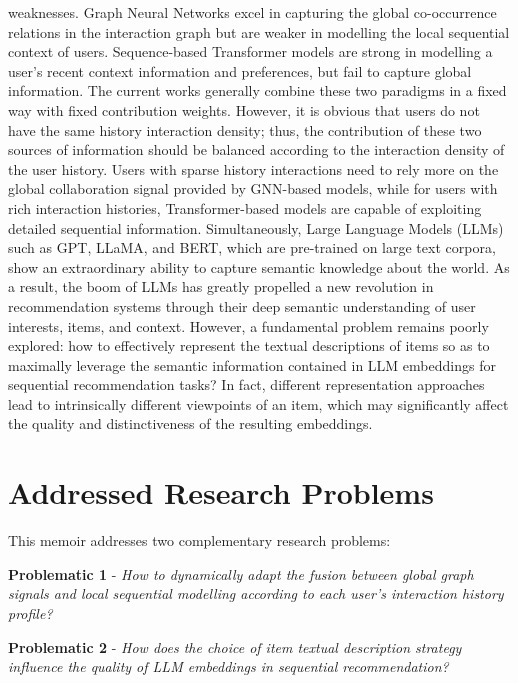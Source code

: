 \documentclass[12pt,a4paper]{report}
\begin{document}
weaknesses. Graph Neural Networks excel in capturing the global co-occurrence
relations in the interaction graph but are weaker in modelling the local
sequential context of users. Sequence-based Transformer models are strong in
modelling a user's recent context information and preferences, but fail to
capture global information.
The current works generally combine these two paradigms in a fixed way with
fixed contribution weights. However, it is obvious that users do not have the
same history interaction density; thus, the contribution of these two sources
of information should be balanced according to the interaction density of the
user history. Users with sparse history interactions need to rely more on the
global collaboration signal provided by GNN-based models, while for users with
rich interaction histories, Transformer-based models are capable of exploiting
detailed sequential information.
Simultaneously, Large Language Models (LLMs) such as GPT, LLaMA, and BERT,
which are pre-trained on large text corpora, show an extraordinary ability to
capture semantic knowledge about the world. As a result, the boom of LLMs has
greatly propelled a new revolution in recommendation systems through their deep
semantic understanding of user interests, items, and context. However, a
fundamental problem remains poorly explored: how to effectively represent the
textual descriptions of items so as to maximally leverage the semantic
information contained in LLM embeddings for sequential recommendation tasks?
In fact, different representation approaches lead to intrinsically different
viewpoints of an item, which may significantly affect the quality and
distinctiveness of the resulting embeddings.

\section*{Addressed Research Problems}

This memoir addresses two complementary research problems:

\medskip
\noindent\textbf{Problematic 1} - \textit{How to dynamically adapt the
fusion between global graph signals and local sequential modelling according
to each user's interaction history profile?}

\medskip
\noindent\textbf{Problematic 2} - \textit{How does the choice of item
textual description strategy influence the quality of LLM embeddings in
sequential recommendation?}
\end{document}
